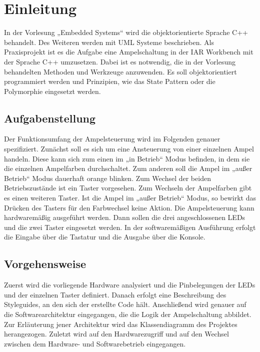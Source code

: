 \chapter{Einleitung}
In der Vorlesung „Embedded Systems“ wird die objektorientierte Sprache C++ behandelt. Des Weiteren werden mit UML Systeme beschrieben. Als Praxisprojekt ist es die Aufgabe eine Ampelschaltung in der IAR Workbench mit der Sprache C++ umzusetzen. Dabei ist es notwendig, die in der Vorlesung behandelten Methoden und Werkzeuge anzuwenden. Es soll objektorientiert programmiert werden und Prinzipien, wie das State Pattern oder die Polymorphie eingesetzt werden.

\section{Aufgabenstellung}
Der Funktionsumfang der Ampelsteuerung wird im Folgenden genauer spezifiziert. Zunächst soll es sich um eine Ansteuerung von einer einzelnen Ampel handeln. Diese kann sich zum einen im „in Betrieb“ Modus befinden, in dem sie die einzelnen Ampelfarben durchschaltet. Zum anderen soll die Ampel im „außer Betrieb“ Modus dauerhaft orange blinken. Zum Wechsel der beiden Betriebszustände ist ein Taster vorgesehen. Zum Wechseln der Ampelfarben gibt es einen weiteren Taster. Ist die Ampel im „außer Betrieb“ Modus, so bewirkt das Drücken des Tasters für den Farbwechsel keine Aktion. Die Ampelsteuerung kann hardwaremäßig ausgeführt werden. Dann sollen die drei angeschlossenen LEDs und die zwei Taster eingesetzt werden. In der softwaremäßigen Ausführung erfolgt die Eingabe über die Tastatur und die Ausgabe über die Konsole.

\section{Vorgehensweise}

Zuerst wird die vorliegende Hardware analysiert und die Pinbelegungen der LEDs und der einzelnen Taster definiert. Danach erfolgt eine Beschreibung des Styleguides, an den sich der erstellte Code hält. Anschließend wird genauer auf die Softwarearchitektur eingegangen, die die Logik der Ampelschaltung abbildet. Zur Erläuterung jener Architektur wird das Klassendiagramm des Projektes herangezogen. Zuletzt wird auf den Hardwarezugriff und auf den Wechsel zwischen dem Hardware- und Softwarebetrieb eingegangen.